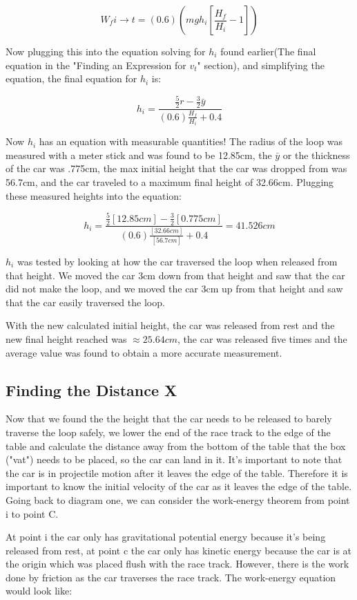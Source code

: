 \documentclass[aps,letterpaper,11pt]{revtex4}
\begin{document}
$$ W_f i \rightarrow t = (0.6)(mgh_i[\frac{H_f}{H_i}-1])$$

Now plugging this into the equation solving for $h_i$ found earlier(The final equation in the "Finding an Expression for $v_t$" section), and simplifying the equation, the final equation for $h_i$ is:

$$ h_i = \frac{\frac{5}{2}r - \frac{3}{2}\bar{y}}{(0.6)\frac{H_f}{H_i} + 0.4}$$

Now $h_i$ has an equation with measurable quantities! The radius of the loop was measured with a meter stick and was found to be 12.85cm, the $\bar{y}$ or the thickness of the car was .775cm, the max initial height that the car was dropped from was 56.7cm, and the car traveled to a maximum final height of 32.66cm. Plugging these measured heights into the equation:

$$ h_i = \frac{\frac{5}{2}[12.85cm] - \frac{3}{2}[0.775cm]}{(0.6)\frac{[32.66cm]}{[56.7cm]} + 0.4} = \boxed{41.526cm}$$

$h_i$ was tested by looking at how the car traversed the loop when released from that height. We moved the car 3cm down from that height and saw that the car did not make the loop, and we moved the car 3cm up from that height and saw that the car easily traversed the loop. 

With the new calculated initial height, the car was released from rest and the new final height reached was $\approx 25.64cm$, the car was released five times and the average value was found to obtain a more accurate measurement. 

\subsection{Finding the Distance X}

Now that we found the the height that the car needs to be released to barely traverse the loop safely, we lower the end of the race track to the edge of the table and calculate the distance away from the bottom of the table that the box ("vat") needs to be placed, so the car can land in it. It's important to note that the car is in projectile motion after it leaves the edge of the table. Therefore it is important to know the initial velocity of the car as it leaves the edge of the table. Going back to diagram one, we can consider the work-energy theorem from point i to point C. 

At point i the car only has gravitational potential energy because it's being released from rest, at point c the car only has kinetic energy because the car is at the origin which was placed flush with the race track. However, there is the work done by friction as the car traverses the race track. The work-energy equation would look like:
\end{document}
